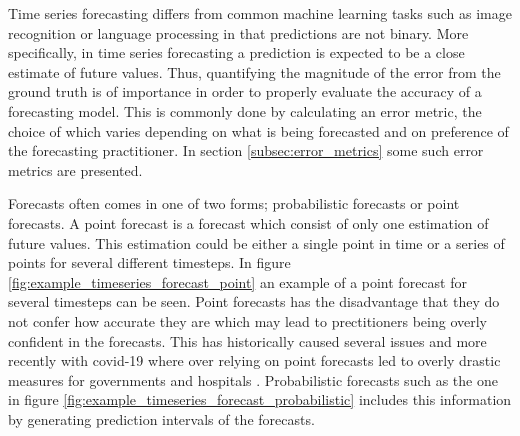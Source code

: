 Time series forecasting differs from common machine learning tasks such as image recognition or language processing in that predictions are not binary. More specifically, in time series forecasting a prediction is expected to be a close estimate of future values. Thus, quantifying the magnitude of the error from the ground truth is of importance in order to properly evaluate the accuracy of a forecasting model. This is commonly done by calculating an error metric, the choice of which varies depending on what is being forecasted and on preference of the forecasting practitioner. \cite{hyndman_forecasting_3rd,hyndman_measuring_nodate, willmott_advantages_2005} In section \ref{subsec:error_metrics} some such error metrics are presented.

Forecasts often comes in one of two forms; probabilistic forecasts or point forecasts. A point forecast is a forecast which consist of only one estimation of future values. This estimation could be either a single point in time or a series of points for several different timesteps. In figure \ref{fig:example_timeseries_forecast_point} an example of a point forecast for several timesteps can be seen. Point forecasts has the disadvantage that they do not confer how accurate they are which may lead to prectitioners being overly confident in the forecasts. This has historically caused several issues and more recently with covid-19 where over relying on point forecasts led to overly drastic measures for governments and hospitals \cite{IOANNIDIS2020}. Probabilistic forecasts such as the one in figure \ref{fig:example_timeseries_forecast_probabilistic} includes this information by generating prediction intervals of the forecasts.

